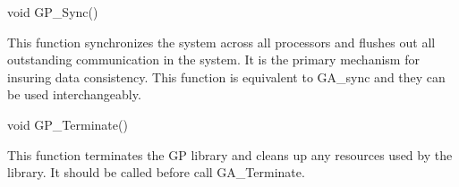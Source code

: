 \documentclass[12pt]{article}
\begin{document}


\begin{capi}
\begin{ccode}
void GP_Sync()
\end{ccode}
\end{capi}

\wcoll

\begin{desc}

This function synchronizes the system across all processors and flushes out all
outstanding communication in the system. It is the primary mechanism for
insuring data consistency. This function is equivalent to GA\_sync and they can
be used interchangeably.

\end{desc}


\begin{capi}
\begin{ccode}
void GP_Terminate()
\end{ccode}
\end{capi}

\wcoll

\begin{desc}

This function terminates the GP library and cleans up any resources used by the
library. It should be called before call GA\_Terminate.

\end{desc}
\end{document}
